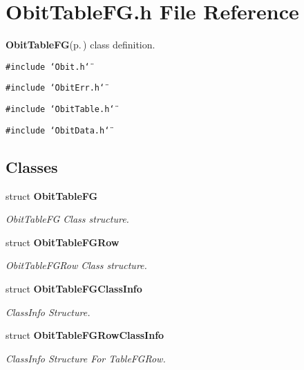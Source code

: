 \section{Obit\-Table\-FG.h File Reference}
\label{ObitTableFG_8h}
{\bf Obit\-Table\-FG}{\rm (p.\,\pageref{structObitTableFG})} class definition. 

{\tt \#include \char`\"{}Obit.h\char`\"{}}\par
{\tt \#include \char`\"{}Obit\-Err.h\char`\"{}}\par
{\tt \#include \char`\"{}Obit\-Table.h\char`\"{}}\par
{\tt \#include \char`\"{}Obit\-Data.h\char`\"{}}\par
\subsection*{Classes}
\begin{CompactItemize}
\item 
struct {\bf Obit\-Table\-FG}
\begin{CompactList}\small\item\em Obit\-Table\-FG Class structure. \item\end{CompactList}\item 
struct {\bf Obit\-Table\-FGRow}
\begin{CompactList}\small\item\em Obit\-Table\-FGRow Class structure. \item\end{CompactList}\item 
struct {\bf Obit\-Table\-FGClass\-Info}
\begin{CompactList}\small\item\em Class\-Info Structure. \item\end{CompactList}\item 
struct {\bf Obit\-Table\-FGRow\-Class\-Info}
\begin{CompactList}\small\item\em Class\-Info Structure For Table\-FGRow. \item\end{CompactList}\end{CompactItemize}
